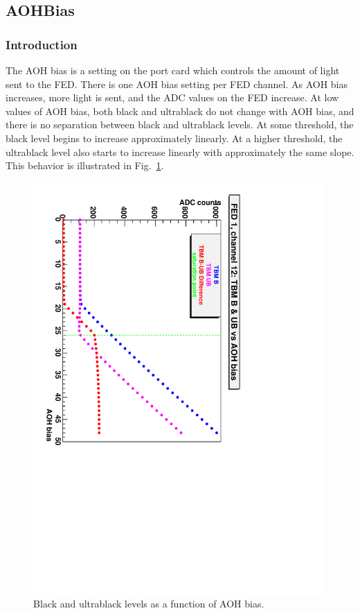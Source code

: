 \subsection{AOHBias}
\label{sec:AOHBiasCalibration}

\subsubsection{Introduction}
The AOH bias is a setting on the port card which controls the amount of light sent to the FED.  There is one AOH bias setting per FED channel.  As AOH bias increases, more light is sent, and the ADC values on the FED increase.  At low values of AOH bias, both black and ultrablack do not change with AOH bias, and there is no separation between black and ultrablack levels. At some threshold, the black level begins to increase approximately linearly.  At a higher threshold, the ultrablack level also starts to increase linearly with approximately the same slope.  This behavior is illustrated in Fig.~\ref{fig:AOHBiasScan}.

\begin{figure}
\begin{center}
 \includegraphics[angle=90,width=0.99\textwidth]{AOHBiasScan.pdf}
\end{center}
\caption{Black and ultrablack levels as a function of AOH bias.}
\label{fig:AOHBiasScan}
\end{figure}

